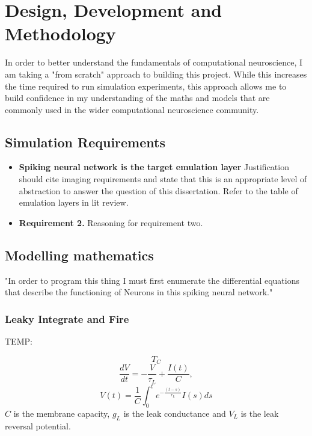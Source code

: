 \chapter{Design, Development and Methodology}

In order to better understand the fundamentals of computational neuroscience, I
am taking a "from scratch" approach to building this project. While this
increases the time required to run simulation experiments, this approach allows
me to build confidence in my understanding of the maths and models that are
commonly used in the wider computational neuroscience community.

\section{Simulation Requirements}

\begin{itemize}
    \item \textbf{Spiking neural network is the target emulation layer}
    Justification should cite imaging requirements and state that this is an
    appropriate level of abstraction to answer the question of this
    dissertation. Refer to the table of emulation layers in lit review.
    \item \textbf{Requirement 2.} Reasoning for requirement two.
\end{itemize}

\section{Modelling mathematics}
"In order to program this thing I must first enumerate the differential equations
that describe the functioning of Neurons in this spiking neural network."
\subsection{Leaky Integrate and Fire}

TEMP:
\begin{figure*}[h]
    \centering
    \begin{equation}\label{eq:LIF_TC}
        T_C
    \end{equation}
    \begin{equation}\label{eq:LIF_RC}
        \frac{d V}{d t} = -\frac{V}{\tau_L} + \frac{I(t)}{C},
    \end{equation}
    \begin{equation}\label{eq:integ_LIF_RC_VL}
        V(t)= \frac{1}{C} \int_{0}^{t} e^{-\frac{(t-s)}{\tau_L}} I(s) ds
    \end{equation}
    $C$ is the membrane capacity, $g_L$ is the leak conductance and $V_L$ is the leak reversal potential.
    \label{LIFequation}
\end{figure*}

